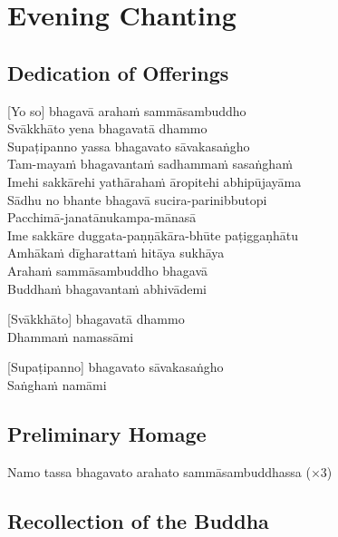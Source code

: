 \chapter{Evening Chanting}

\section*{Dedication of Offerings}


[Yo so] bhagavā arahaṁ sammāsambuddho\\
Svākkhāto yena bhagavatā dhammo\\
Supaṭipanno yassa bhagavato sāvakasaṅgho\\
Tam-mayaṁ bhagavantaṁ sadhammaṁ sasaṅghaṁ\\
Imehi sakkārehi yathārahaṁ āropitehi abhipūjayāma\\
Sādhu no bhante bhagavā sucira-parinibbutopi\\
Pacchimā-janatānukampa-mānasā\\
Ime sakkāre duggata-paṇṇākāra-bhūte paṭiggaṇhātu\\
Amhākaṁ dīgharattaṁ hitāya sukhāya\\
Arahaṁ sammāsambuddho bhagavā\\
Buddhaṁ bhagavantaṁ abhivādemi

[Svākkhāto] bhagavatā dhammo\\
Dhammaṁ namassāmi

[Supaṭipanno] bhagavato sāvakasaṅgho\\
Saṅghaṁ namāmi

\section*{Preliminary Homage}

\begin{leader}
\end{leader}

Namo tassa bhagavato arahato sammāsambuddhassa (×3)

\section*{Recollection of the Buddha}

\begin{leader}
\end{leader}

